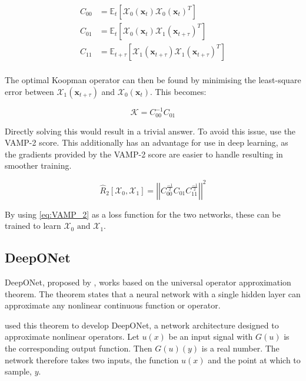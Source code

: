 \begin{equation}
    \begin{aligned}
        C_{00} &= \mathbb{E}_t \left[\mathcal{X}_0(\mathbf{x}_t)\mathcal{X}_0(\mathbf{x}_t)^T\right] \\
        C_{01} &= \mathbb{E}_t \left[\mathcal{X}_0(\mathbf{x}_t)\mathcal{X}_1(\mathbf{x}_{t + \tau})^T\right] \\
        C_{11} &= \mathbb{E}_{t + \tau} \left[\mathcal{X}_1(\mathbf{x}_{t + \tau})\mathcal{X}_1(\mathbf{x}_{t + \tau})^T\right] \\
    \end{aligned}
\end{equation}

The optimal Koopman operator can then be found by minimising the least-square error between \(\mathcal{X}_1(\mathbf{x}_{t + \tau})\) and \(\mathcal{X}_0(\mathbf{x}_t)\). This becomes:

\begin{equation}
    \mathcal{K} = C_{00}^{-1} C_{01}
\end{equation}

Directly solving this would result in a trivial answer. To avoid this issue,
\parencites{wuVariationalApproachLearning2019}{mardtVAMPnetsDeepLearning2018} use the VAMP-2 score. This additionally
has an advantage for use in deep learning, as the gradients provided by the VAMP-2 score are easier to handle resulting
in smoother training.

\begin{equation}
    \label{eq:VAMP_2}
    \hat{R}_2\left[\mathcal{X}_0, \mathcal{X}_1\right] = \left|\left| C_{00}^\frac{-1}{2}C_{01} C_{11}^\frac{-1}{2}\right|\right|^2 
\end{equation}

By using \eqref{eq:VAMP_2} as a loss function for the two networks, these can be trained to learn \(\mathcal{X}_0 \text{ and } \mathcal{X}_1\).

\subsection{DeepONet}
\label{subsec:deeponet}
DeepONet, proposed by \textcite{luLearningNonlinearOperators2021}, works based on the universal operator approximation
theorem. The theorem states that a neural network with a single hidden layer can approximate any nonlinear continuous
function or operator. 

\textcite{luLearningNonlinearOperators2021} used this theorem to develop DeepONet, a network architecture designed to
approximate nonlinear operators. Let \(u(x)\) be an input signal with \(G(u)\) is the corresponding output function.
Then \(G(u)(y)\) is a real number. The network therefore takes two inputs, the function \(u(x)\) and the point at which
to sample, \(y\). 

